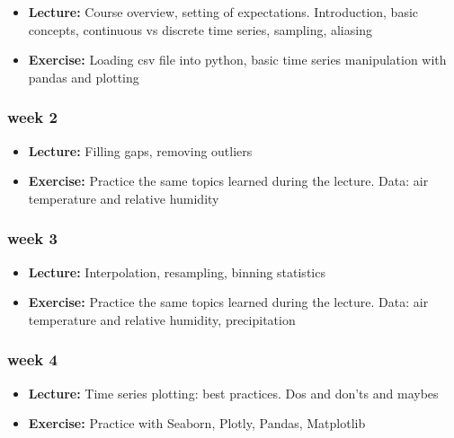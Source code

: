 \documentclass[
  letterpaper,
  DIV=11,
  numbers=noendperiod,
  oneside]{scrreprt}
\providecommand{\tightlist}{%
  \setlength{\itemsep}{0pt}\setlength{\parskip}{0pt}}\usepackage{longtable,booktabs,array}
\begin{document}
\begin{itemize}
\tightlist
\item
  \textbf{Lecture:} Course overview, setting of expectations.
  Introduction, basic concepts, continuous vs discrete time series,
  sampling, aliasing
\item
  \textbf{Exercise:} Loading csv file into python, basic time series
  manipulation with pandas and plotting
\end{itemize}

\hypertarget{week-2}{%
\subsubsection*{week 2}\label{week-2}}

\begin{itemize}
\tightlist
\item
  \textbf{Lecture:} Filling gaps, removing outliers
\item
  \textbf{Exercise:} Practice the same topics learned during the
  lecture. Data: air temperature and relative humidity
\end{itemize}

\hypertarget{week-3}{%
\subsubsection*{week 3}\label{week-3}}

\begin{itemize}
\tightlist
\item
  \textbf{Lecture:} Interpolation, resampling, binning statistics
\item
  \textbf{Exercise:} Practice the same topics learned during the
  lecture. Data: air temperature and relative humidity, precipitation
\end{itemize}

\hypertarget{week-4}{%
\subsubsection*{week 4}\label{week-4}}

\begin{itemize}
\tightlist
\item
  \textbf{Lecture:} Time series plotting: best practices. Dos and don'ts
  and maybes
\item
  \textbf{Exercise:} Practice with Seaborn, Plotly, Pandas, Matplotlib
\end{itemize}
\end{document}
